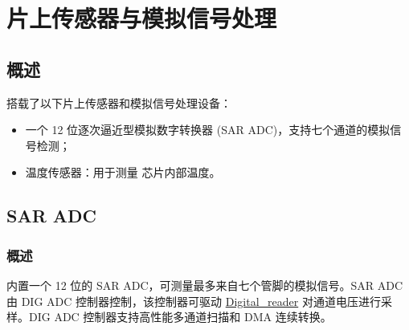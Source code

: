 \documentclass[main\_\_CN.tex]{subfiles}
\begin{document}

\ifglobal
\else
    {\let\clearpage\relax \listoftodos}
    {\let\clearpage\relax \listofdonetodos}
    \tableofcontents
\fi




\hypertarget{sensor}{}
\chapter{片上传感器与模拟信号处理}
\label{mod:sensor}

\section{概述}

\chipname{} 搭载了以下片上传感器和模拟信号处理设备：

\begin{itemize}
    \item 一个 12 位逐次逼近型模拟数字转换器 (SAR ADC)，支持七个通道的模拟信号检测；
    \item 温度传感器：用于测量 \chipname{} 芯片内部温度。
    
\end{itemize}

\section{SAR ADC}\label{sec:sensor-sar-adc}

\subsection{概述}

\chipname{} 内置一个 12 位的 SAR ADC，可测量最多来自七个管脚的模拟信号。SAR ADC 由 DIG ADC 控制器控制，该控制器可驱动 \hyperref[other:sensor-item-read-data-from-sar-adc]{Digital\_reader} 对通道电压进行采样。DIG ADC 控制器支持高性能多通道扫描和 DMA 连续转换。
\end{document}
